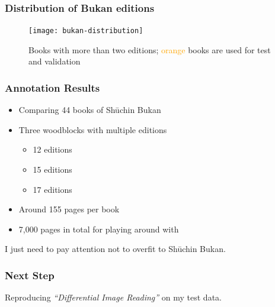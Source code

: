 \documentclass{beamer}
\begin{document}
  \begin{frame}
    \frametitle{Distribution of Bukan editions}
    \begin{figure}
      \centering
      \texttt{[image: bukan-distribution]}
      \caption{Books with more than two editions;
        \textcolor{orange}{orange} books are used for test and validation}
    \end{figure}
  \end{frame}

  \begin{frame}
    \frametitle{Annotation Results}
    \begin{itemize}
    \item Comparing 44 books of Shūchin Bukan
    \item Three woodblocks with multiple editions
      \begin{itemize}
        \item 12 editions
        \item 15 editions
        \item 17 editions
      \end{itemize}
      \item Around 155 pages per book
      \item 7,000 pages in total for playing around with
    \end{itemize}

    \bigskip
    I just need to pay attention not to overfit to Shūchin Bukan.
  \end{frame}

  \begin{frame}
    \frametitle{Next Step}
    Reproducing \emph{``Differential Image Reading''} on my test data.
  \end{frame}
\end{document}
